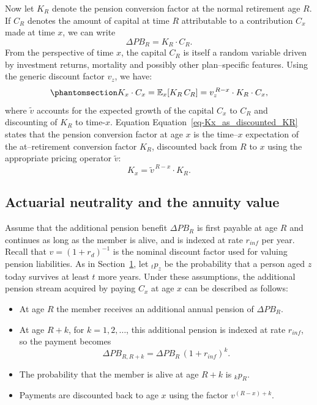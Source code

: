 \documentclass[
  letterpaper,
  DIV=11,
  numbers=noendperiod]{scrreprt}
\begin{document}
Now let \(K_R\) denote the pension conversion factor at the normal
retirement age \(R\). If \(C_R\) denotes the amount of capital at time
\(R\) attributable to a contribution \(C_x\) made at time \(x\), we can
write \[
    \Delta PB_R = K_R \cdot C_R.
\] From the perspective of time \(x\), the capital \(C_R\) is itself a
random variable driven by investment returns, mortality and possibly
other plan--specific features. Using the generic discount factor
\(v_z\), we have:
\begin{equation}\protect\phantomsection\label{eq-Kx_as_discounted_KR}{
    K_x \cdot C_x = \mathbb{E}_x\!\left[ K_R \, C_R \right] = v_z^{\,R-x} \cdot K_R \cdot C_x,
}\end{equation} where \(\tilde{v}\) accounts for the expected growth of
the capital \(C_x\) to \(C_R\) and discounting of \(K_R\) to time-\(x\).
Equation Equation~\ref{eq-Kx_as_discounted_KR} states that the pension
conversion factor at age \(x\) is the time--\(x\) expectation of the
at--retirement conversion factor \(K_R\), discounted back from \(R\) to
\(x\) using the appropriate pricing operator \(\tilde{v}\): \[
    K_x = \tilde{v}^{\,R-x} \cdot K_R.
\]

\subsection*{Actuarial neutrality and the annuity
value}\label{actuarial-neutrality-and-the-annuity-value}

Assume that the additional pension benefit \(\Delta PB_R\) is first
payable at age \(R\) and continues as long as the member is alive, and
is indexed at rate \(r_{inf}\) per year. Recall that
\(v = (1 + r_d)^{-1}\) is the nominal discount factor used for valuing
pension liabilities. As in Section~\hyperref[sec:IntroPensions]{1}, let
\({}_t p_z\) be the probability that a person aged \(z\) today survives
at least \(t\) more years. Under these assumptions, the additional
pension stream acquired by paying \(C_x\) at age \(x\) can be described
as follows:

\begin{itemize}
\item
  At age \(R\) the member receives an additional annual pension of
  \(\Delta PB_R\).
\item
  At age \(R + k\), for \(k = 1, 2, \dots\), this additional pension is
  indexed at rate \(r_{inf}\), so the payment becomes \[
    \Delta PB_{R, R+k} = \Delta PB_R \, (1 + r_{inf})^{k}.
  \]
\item
  The probability that the member is alive at age \(R + k\) is
  \({}_k p_R\).
\item
  Payments are discounted back to age \(x\) using the factor
  \(v^{(R-x) + k}\).
\end{itemize}
\end{document}

